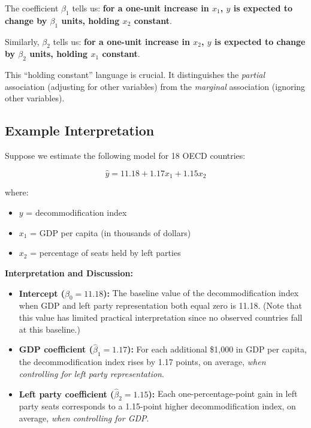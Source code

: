 \documentclass[
  letterpaper,
  DIV=11,
  numbers=noendperiod]{scrreprt}
\providecommand{\tightlist}{%
  \setlength{\itemsep}{0pt}\setlength{\parskip}{0pt}}
\begin{document}
The coefficient \(\beta_1\) tells us: \textbf{for a one-unit increase in
\(x_1\), \(y\) is expected to change by \(\beta_1\) units, holding
\(x_2\) constant}.

Similarly, \(\beta_2\) tells us: \textbf{for a one-unit increase in
\(x_2\), \(y\) is expected to change by \(\beta_2\) units, holding
\(x_1\) constant}.

This ``holding constant'' language is crucial. It distinguishes the
\emph{partial} association (adjusting for other variables) from the
\emph{marginal} association (ignoring other variables).

\subsection{Example Interpretation}\label{example-interpretation}

Suppose we estimate the following model for 18 OECD countries:

\[
\hat{y} = 11.18 + 1.17 x_1 + 1.15 x_2
\]

where:

\begin{itemize}
\tightlist
\item
  \(y\) = decommodification index
\item
  \(x_1\) = GDP per capita (in thousands of dollars)
\item
  \(x_2\) = percentage of seats held by left parties
\end{itemize}

\textbf{Interpretation and Discussion:}

\begin{itemize}
\item
  \textbf{Intercept (\(\hat{\beta}_0 = 11.18\)):} The baseline value of
  the decommodification index when GDP and left party representation
  both equal zero is 11.18. (Note that this value has limited practical
  interpretation since no observed countries fall at this baseline.)
\item
  \textbf{GDP coefficient (\(\hat{\beta}_1 = 1.17\)):} For each
  additional \$1,000 in GDP per capita, the decommodification index
  rises by 1.17 points, on average, \emph{when controlling for left
  party representation}.
\item
  \textbf{Left party coefficient (\(\hat{\beta}_2 = 1.15\)):} Each
  one-percentage-point gain in left party seats corresponds to a
  1.15-point higher decommodification index, on average, \emph{when
  controlling for GDP}.
\end{itemize}
\end{document}
